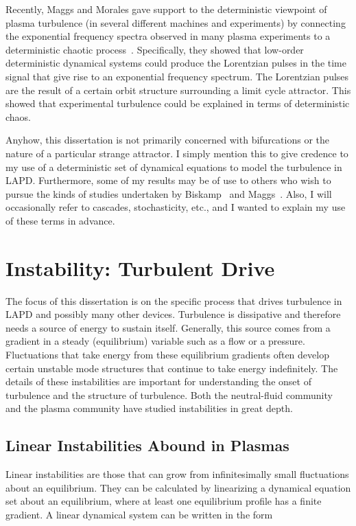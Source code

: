 Recently, Maggs and Morales gave support to the deterministic viewpoint of plasma turbulence (in several different machines and experiments) by connecting the exponential frequency spectra
observed in many plasma experiments to a deterministic chaotic process~\cite{maggs2011,maggs2012a,maggs2012b}. Specifically, they showed that low-order deterministic dynamical systems could
produce the Lorentzian pulses in the time signal that give rise to an exponential frequency spectrum. The Lorentzian pulses are the result of a certain orbit structure surrounding
a limit cycle attractor. This showed that experimental turbulence could be explained in terms of deterministic chaos.

Anyhow, this dissertation is not primarily concerned with bifurcations or the nature of a particular strange attractor. I simply mention this to give credence to my use of a deterministic set
of dynamical equations to model the turbulence in LAPD. Furthermore, some of my results may be of use to others who wish to pursue the kinds of studies undertaken by Biskamp~\cite{biskamp1985}
and Maggs~\cite{maggs2012a}. Also, I will occasionally refer to cascades, stochasticity, etc., and I wanted to explain my use of these terms in advance.


\section{Instability: Turbulent Drive}
\label{s_nlin_stability}

The focus of this dissertation is on the specific process that drives turbulence in LAPD and possibly many other devices. Turbulence is dissipative and therefore needs a source of energy
to sustain itself. Generally, this source comes from a gradient in a steady (equilibrium) variable such as a flow or a pressure. Fluctuations that take energy from these equilibrium
gradients often develop certain unstable mode structures that continue to take energy indefinitely. The details of these instabilities are important for understanding the onset of turbulence
and the structure of turbulence. Both the neutral-fluid community and the plasma community have studied instabilities in great depth.

\subsection{Linear Instabilities Abound in Plasmas}
\label{s_lin_inst_plasmas}

Linear instabilities are those that can grow from infinitesimally small fluctuations about an equilibrium. They can be calculated by linearizing a dynamical equation set about an equilibrium, where
at least one equilibrium profile has a finite gradient. A linear dynamical system can be written in the form

